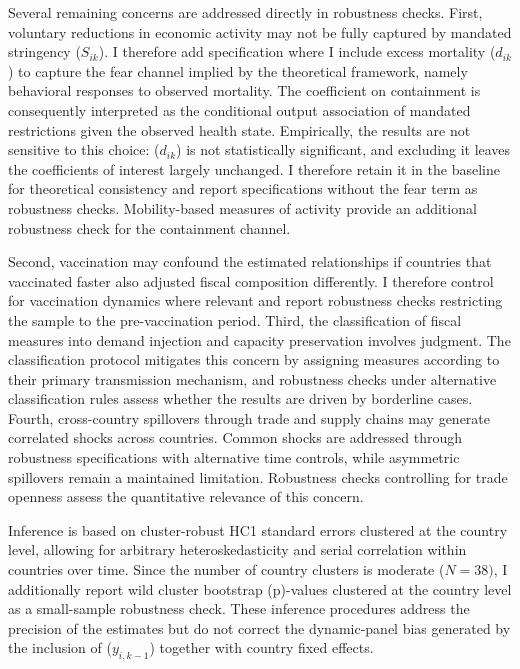\documentclass[12pt, a4paper]{article}
\begin{document}
Several remaining concerns are addressed directly in robustness checks. First, voluntary reductions in economic activity may not be fully captured by mandated stringency (\(S_{ik}\)). I therefore add specification where I include excess mortality (\(d_{ik}\)) to capture the fear channel implied by the theoretical framework, namely behavioral responses to observed mortality. The coefficient on containment is consequently interpreted as the conditional output association of mandated restrictions given the observed health state. Empirically, the results are not sensitive to this choice: (\(d_{ik}\)) is not statistically significant, and excluding it leaves the coefficients of interest largely unchanged. I therefore retain it in the baseline for theoretical consistency and report specifications without the fear term as robustness checks. Mobility-based measures of activity provide an additional robustness check for the containment channel.

Second, vaccination may confound the estimated relationships if countries that vaccinated faster also adjusted fiscal composition differently. I therefore control for vaccination dynamics where relevant and report robustness checks restricting the sample to the pre-vaccination period. Third, the classification of fiscal measures into demand injection and capacity preservation involves judgment. The classification protocol mitigates this concern by assigning measures according to their primary transmission mechanism, and robustness checks under alternative classification rules assess whether the results are driven by borderline cases. Fourth, cross-country spillovers through trade and supply chains may generate correlated shocks across countries. Common shocks are addressed through robustness specifications with alternative time controls, while asymmetric spillovers remain a maintained limitation. Robustness checks controlling for trade openness assess the quantitative relevance of this concern.

Inference is based on cluster-robust HC1 standard errors clustered at the country level, allowing for arbitrary heteroskedasticity and serial correlation within countries over time. Since the number of country clusters is moderate (\(N=38)\), I additionally report wild cluster bootstrap (p)-values clustered at the country level as a small-sample robustness check. These inference procedures address the precision of the estimates but do not correct the dynamic-panel bias generated by the inclusion of (\(y_{i,k-1}\)) together with country fixed effects.
\end{document}
